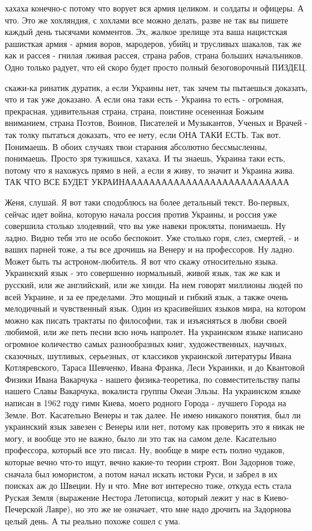 хахаха конечно-с потому что ворует вся армия целиком. и солдаты и офицеры. А
что. Это же хохляндия, с хохлами все можно делать, разве не так вы пишете
каждый день тысячами комментов. Эх, жалкое зрелище эта ваша нацистская
рашисткая армия - армия воров, мародеров, убийц и трусливых шакалов, так же как
и рассея - гнилая лживая рассея, страна рабов, страна больших начальников. Одно
только радует, что ей скоро будет просто полный безоговорочный ПИЗДЕЦ.

скажи-ка ринатик дуратик, а если Украины нет, так зачем ты пытаешься доказать,
что и так уже доказано. А если она таки есть - Украина то есть - огромная,
прекрасная, удивительная страна, страна, поистине осененная Божьим вниманием,
страна Поэтов, Воинов, Писателей и Музыкантов, Ученых и Врачей - так толку
пытаться доказать, что ее нету, если ОНА ТАКИ ЕСТЬ. Так вот. Понимаешь. В обоих
случаях твои старания абсолютно бессмысленны, понимаешь. Просто зря тужишься,
хахаха. И ты знаешь, Украина таки есть, потому что я нахожусь прямо в ней, а
если я живу, то значит и Украина жива. ТАК ЧТО ВСЕ БУДЕТ
УКРАИНААААААААААААААААААААААААААА

Женя, слушай. Я вот таки сподоблюсь на более детальный текст.
Во-первых, сейчас идет война, которую начала россия против Украины,
и россия уже совершила столько злодеяний, что вы уже навеки прокляты, 
понимаешь. Ну ладно. Видно тебя это не особо беспокоит. Уже столько горя, слез,
смертей, - и ваших парней тоже, а ты все дрочишь на Венеру и на профессоров.
Ну ладно. Может быть ты астроном-любитель. Я вот что скажу относительно языка.
Украинский язык - это совершенно нормальный, живой язык, так же как и русский, или
же английский, или же хинди. На нем говорят миллионы людей по всей Украине,
и за ее пределами. Это мощный и гибкий язык, а также очень мелодичный и чувственный язык.
Один из красивейших языков мира, на котором можно как писать трактаты по философии,
так и изъясняться в любви своей любимой, или же петь песни всю ночь напролет. 
На украинском языке написано огромное количество самых разнообразных книг,
художественных, научных, сказочных, шутливых, серьезных,
от классиков украинской литературы Ивана Котляревского, Тараса Шевченко, Ивана Франка, Леси Украинки, и до Квантовой Физики Ивана Вакарчука - нашего физика-теоретика, по совместительству папы нашего Славы Вакарчука,
вокалиста группы Океан Эльзы. На украинском языке написан в 1962 году гимн Киева, моего родного
Города - лучшего Города на Земле. Вот. Касательно Венеры и так далее. Не имею никакого понятия,
был ли украинский язык завезен с Венеры или нет, потому как проверить это я никак не могу, и вообще это не важно,
было ли это так на самом деле. Касательно профессора, который все это писал. Ну, вообще в мире есть полно
чудаков, которые вечно что-то ищут, вечно какие-то теории строят. Вон Задорнов тоже, сначала был юмористом,
а потом начал искать истоки Руси, и забрел в их поисках аж до Швеции. Ну и что. Мне вот интересно тоже, откуда
есть стала Руская Земля (выражение Нестора Летописца, который лежит у нас в Киево-Печерской Лавре),
но это же не означает, что мне надо дрочить на Задорнова целый день. А ты реально похоже сошел с ума.


